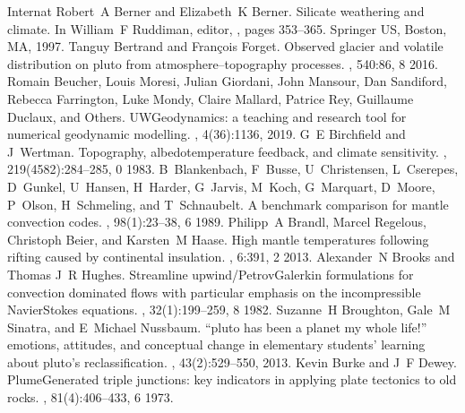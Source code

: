 \documentclass[letterpaper,10pt,english]{jupyterBook}
\begin{document}
\begin{sphinxthebibliography}{Internat}
\sphinxAtStartPar
Robert A Berner and Elizabeth K Berner. Silicate weathering and climate. In William F Ruddiman, editor, , pages 353–365. Springer US, Boston, MA, 1997.
\sphinxAtStartPar
Tanguy Bertrand and François Forget. Observed glacier and volatile distribution on pluto from atmosphere–topography processes. , 540:86, 8 2016.
\sphinxAtStartPar
Romain Beucher, Louis Moresi, Julian Giordani, John Mansour, Dan Sandiford, Rebecca Farrington, Luke Mondy, Claire Mallard, Patrice Rey, Guillaume Duclaux, and Others. UWGeodynamics: a teaching and research tool for numerical geodynamic modelling. , 4(36):1136, 2019.
\sphinxAtStartPar
G E Birchfield and J Wertman. Topography, albedo\sphinxhyphen{}temperature feedback, and climate sensitivity. , 219(4582):284–285, 0 1983.
\sphinxAtStartPar
B Blankenbach, F Busse, U Christensen, L Cserepes, D Gunkel, U Hansen, H Harder, G Jarvis, M Koch, G Marquart, D Moore, P Olson, H Schmeling, and T Schnaubelt. A benchmark comparison for mantle convection codes. , 98(1):23–38, 6 1989.
\sphinxAtStartPar
Philipp A Brandl, Marcel Regelous, Christoph Beier, and Karsten M Haase. High mantle temperatures following rifting caused by continental insulation. , 6:391, 2 2013.
\sphinxAtStartPar
Alexander N Brooks and Thomas J R Hughes. Streamline upwind/Petrov\sphinxhyphen{}Galerkin formulations for convection dominated flows with particular emphasis on the incompressible Navier\sphinxhyphen{}Stokes equations. , 32(1):199–259, 8 1982.
\sphinxAtStartPar
Suzanne H Broughton, Gale M Sinatra, and E Michael Nussbaum. “pluto has been a planet my whole life!” emotions, attitudes, and conceptual change in elementary students' learning about pluto's reclassification. , 43(2):529–550, 2013.
\sphinxAtStartPar
Kevin Burke and J F Dewey. Plume\sphinxhyphen{}Generated triple junctions: key indicators in applying plate tectonics to old rocks. , 81(4):406–433, 6 1973.

\end{sphinxthebibliography}
\end{document}
